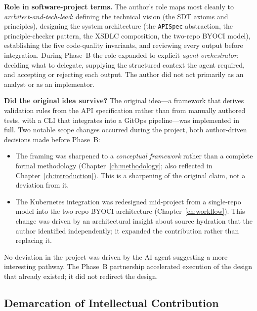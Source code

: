 \textbf{Role in software-project terms.} The author's role maps most cleanly to \emph{architect-and-tech-lead}: defining the technical vision (the SDT axioms and principles), designing the system architecture (the \texttt{APISpec} abstraction, the principle-checker pattern, the XSDLC composition, the two-repo BYOCI model), establishing the five code-quality invariants, and reviewing every output before integration. During Phase~B the role expanded to explicit \emph{agent orchestrator}: deciding what to delegate, supplying the structured context the agent required, and accepting or rejecting each output. The author did not act primarily as an analyst or as an implementor.

\textbf{Did the original idea survive?} The original idea---a framework that derives validation rules from the API specification rather than from manually authored tests, with a CLI that integrates into a GitOps pipeline---was implemented in full. Two notable scope changes occurred during the project, both author-driven decisions made before Phase~B:

\begin{itemize}
    \item The framing was sharpened to a \emph{conceptual framework} rather than a complete formal methodology (Chapter~\ref{ch:methodology}; also reflected in Chapter~\ref{ch:introduction}). This is a sharpening of the original claim, not a deviation from it.
    \item The Kubernetes integration was redesigned mid-project from a single-repo model into the two-repo BYOCI architecture (Chapter~\ref{ch:workflow}). This change was driven by an architectural insight about source hydration that the author identified independently; it expanded the contribution rather than replacing it.
\end{itemize}

No deviation in the project was driven by the AI agent suggesting a more interesting pathway. The Phase~B partnership accelerated execution of the design that already existed; it did not redirect the design.

\subsection{Demarcation of Intellectual Contribution}
\label{subsec:contribution-boundary}

